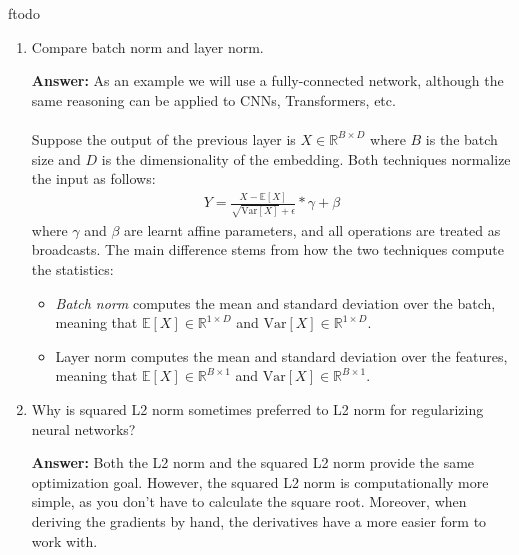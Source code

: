 ƒtodo\documentclass{article}
\newenvironment{QandA}{\begin{enumerate}[label=\arabic*.]}{\end{enumerate}}
\newenvironment{answer}{\par\normalfont \textbf{Answer:}}{}
\newcommand{\R}{\mathbb{R}}
\newcommand{\Exp}[1]{\mathbb{E}\left[ #1 \right]}
\newcommand{\Vari}[1]{\text{Var}\left[ #1 \right]}
\begin{document}
\begin{QandA}
    \item Compare batch norm and layer norm.
    \begin{answer}
        As an example we will use a fully-connected network, although the same reasoning can be applied to CNNs, Transformers, etc. \\\\
        Suppose the output of the previous layer is $X \in \R^{B \times D}$ where $B$ is the batch size and $D$ is the dimensionality of the embedding. Both techniques normalize the input as follows:
        \begin{align*}
            Y = \frac{X - \Exp{X}}{\sqrt{\Vari{X}} + \epsilon} * \gamma + \beta
        \end{align*}
        where $\gamma$ and $\beta$ are learnt affine parameters, and all operations are treated as broadcasts. The main difference stems from how the two techniques compute the statistics:
        \begin{itemize}
            \item \textit{Batch norm} computes the mean and standard deviation over the batch, meaning that $\Exp{X} \in \R^{1 \times D}$ and $\Vari{X} \in \R^{1 \times D}$.
            \item Layer norm computes the mean and standard deviation over the features, meaning that $\Exp{X} \in \R^{B \times 1}$ and $\Vari{X} \in \R^{B \times 1}$.
        \end{itemize}
    \end{answer}

    \item Why is squared L2 norm sometimes preferred to L2 norm for regularizing neural networks?
    \begin{answer}
        Both the L2 norm and the squared L2 norm provide the same optimization goal. However, the squared L2 norm is computationally more simple, as you don't have to calculate the square root. Moreover, when deriving the gradients by hand, the derivatives have a more easier form to work with. 
    \end{answer}


\end{QandA}
\end{document}
